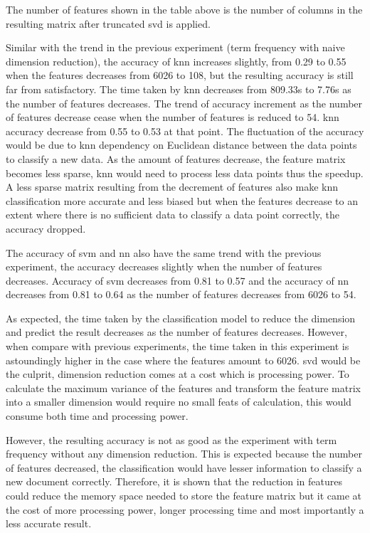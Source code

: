 The number of features shown in the table above is the number of columns in the resulting matrix after truncated \ac{svd} is applied.

Similar with the trend in the previous experiment (term frequency with naive dimension reduction), the accuracy of \ac{knn} increases slightly, from 0.29 to 0.55 when the features decreases from 6026 to 108, but the resulting accuracy is still far from satisfactory. The time taken by \ac{knn} decreases from 809.33s to 7.76s as the number of features decreases. The trend of accuracy increment as the number of features decrease cease when the number of features is reduced to 54. \Ac{knn} accuracy decrease from 0.55 to 0.53 at that point. The fluctuation of the accuracy would be due to \ac{knn} dependency on Euclidean distance between the data points to classify a new data. As the amount of features decrease, the feature matrix becomes less sparse, \ac{knn} would need to process less data points thus the speedup. A less sparse matrix resulting from the decrement of features also make \ac{knn} classification more accurate and less biased but when the features decrease to an extent where there is no sufficient data to classify a data point correctly, the accuracy dropped.

The accuracy of \ac{svm} and \ac{nn} also have the same trend with the previous experiment, the accuracy decreases slightly when the number of features decreases. Accuracy of \ac{svm} decreases from 0.81 to 0.57 and the accuracy of \ac{nn} decreases from 0.81 to 0.64 as the number of features decreases from 6026 to 54.

As expected, the time taken by the classification model to reduce the dimension and predict the result decreases as the number of features decreases. However, when compare with previous experiments, the time taken in this experiment is astoundingly higher in the case where the features amount to 6026. \Ac{svd} would be the culprit, dimension reduction comes at a cost which is processing power. To calculate the maximum variance of the features and transform the feature matrix into a smaller dimension would require no small feats of calculation, this would consume both time and processing power.

However, the resulting accuracy is not as good as the experiment with term frequency without any dimension reduction. This is expected because the number of features decreased, the classification would have lesser information to classify a new document correctly. Therefore, it is shown that the reduction in features could reduce the memory space needed to store the feature matrix but it came at the cost of more processing power, longer processing time and most importantly a less accurate result.


